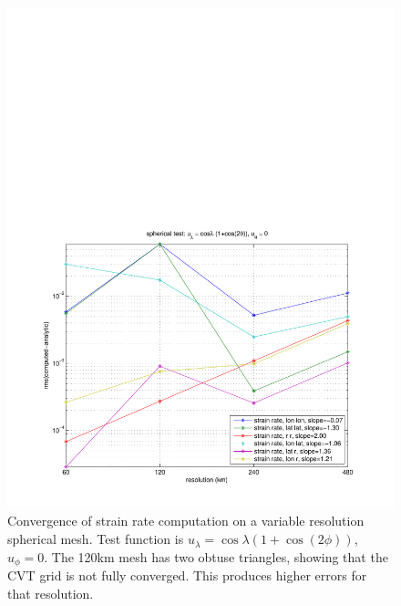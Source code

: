 \documentclass[11pt]{report}
\begin{document}
\begin{figure}[htbp]
 \center
 \includegraphics[scale=0.8, trim = 0 0 0 4in, clip]{f/a19_sph_conv_test_6.pdf}
 \caption{Convergence of strain rate computation on a variable resolution spherical mesh.  Test function is $u_{\lambda}=\cos \lambda (1+\cos(2\phi))$, $u_{\phi}=0$.  The 120km mesh has two obtuse triangles, showing that the CVT grid is not fully converged.  This produces higher errors for that resolution.}
 \label{fig:convergence1b}
\end{figure}
\end{document}
